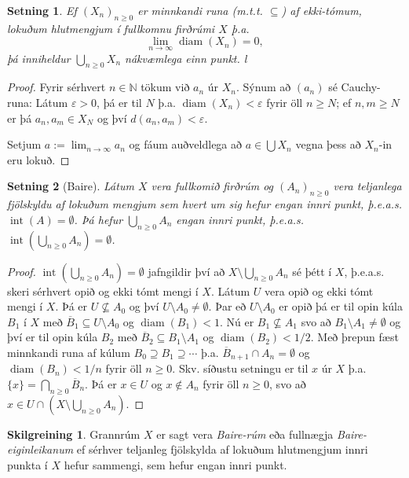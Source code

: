 \documentclass[a4paper,icelandic]{book}
\theoremstyle{definition}
\newtheorem{skilgr}{Skilgreining}[section]
\theoremstyle{plain}
\newtheorem{setn}{Setning}[section]
\theoremstyle{remark}
\newcommand{\N}{\mathbb{N}} %
\DeclareMathOperator{\innmengi}{int} %
\DeclareMathOperator{\diam}{diam} %
\begin{document}
\begin{setn}
  Ef $(X_n)_{n\geq 0}$ er minnkandi runa (m.t.t. $\subseteq$) af ekki-tómum,
  lokuðum hlutmengjum í fullkomnu firðrúmi $X$ þ.a.\[
  \lim_{n\to\infty}\diam(X_n) = 0,
  \]
  þá inniheldur $\bigcup_{n\geq 0} X_n$ nákvæmlega einn punkt.
l\end{setn}
\begin{proof}
  Fyrir sérhvert $n\in\N$ tökum við $a_n$ úr $X_n$. Sýnum að $(a_n)$ sé
  Cauchy-runa: Látum $\varepsilon>0$, þá er til $N$ þ.a.
  $\diam(X_n)<\varepsilon$ fyrir öll $n\geq N$; ef $n,m\geq N$ er þá $a_n,a_m\in
  X_N$ og því $d(a_n,a_m) < \varepsilon$.

  Setjum $a := \lim_{n\to\infty} a_n$ og fáum auðveldlega að $a\in\bigcup X_n$
  vegna þess að $X_n$-in eru lokuð.
\end{proof}
\begin{setn}
  [Baire]
  Látum $X$ vera fullkomið firðrúm og $(A_n)_{n\geq 0}$ vera teljanlega
  fjölskyldu af lokuðum mengjum sem hvert um sig hefur engan innri punkt,
  þ.e.a.s. $\innmengi(A) = \emptyset$. Þá hefur $\bigcup_{n\geq 0} A_n$
  engan innri punkt, þ.e.a.s. $\innmengi\left( \bigcup_{n\geq 0} A_n \right) =
  \emptyset$.
\end{setn}
\begin{proof}
  $\innmengi\left(\bigcup_{n\geq 0}A_n\right)=\emptyset$ jafngildir því að
  $X\setminus\bigcup_{n\geq 0}A_n$ sé þétt í $X$, þ.e.a.s. skeri sérhvert opið
  og ekki tómt mengi í $X$. Látum $U$ vera opið og ekki tómt mengi í $X$. Þá er
  $U\nsubseteq A_0$ og því $U\setminus A_0 \neq\emptyset$. Þar eð $U\setminus
  A_0$ er opið þá er til opin kúla $B_1$ í $X$ með $\overline B_1\subseteq
  U\setminus A_0$ og $\diam(B_1)<1$. Nú er $B_1\nsubseteq A_1$ svo að
  $B_1\setminus A_1 \neq \emptyset$ og því er til opin kúla $B_2$ með $\overline
  B_2 \subseteq B_1\setminus A_1$ og $\diam(B_2)<1/2$. Með þrepun fæst minnkandi
  runa af kúlum $B_0\supseteq B_1\supseteq \cdots$ þ.a. $\overline B_{n+1} \cap
  A_n = \emptyset$ og $\diam(B_n)<1/n$ fyrir öll $n\geq 0$. Skv. síðustu
  setningu er til $x$ úr $X$ þ.a. $\{x\} = \bigcap_{n\geq 0} \overline B_n$. Þá
  er $x\in U$ og $x\notin A_n$ fyrir öll $n\geq 0$, svo að $x\in U\cap
  \left(X\setminus\bigcup_{n\geq 0} A_n\right)$.
\end{proof}
\begin{skilgr}
  Grannrúm $X$ er sagt vera \emph{Baire-rúm} eða fullnægja
  \emph{Baire-eiginleikanum} ef sérhver teljanleg fjölskylda af lokuðum
  hlutmengjum innri punkta í $X$ hefur sammengi, sem hefur engan innri punkt.
\end{skilgr}
\end{document}
